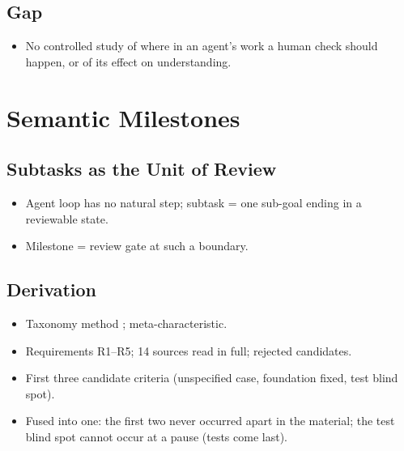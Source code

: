 \section{Gap}
\begin{itemize}
  \item No controlled study of where in an agent's work a human check should happen, or of its effect on understanding.
\end{itemize}


\chapter{Semantic Milestones}
\label{chap:criteria}

\section{Subtasks as the Unit of Review}
\begin{itemize}
  \item Agent loop has no natural step; subtask = one sub-goal ending in a reviewable state.
  \item Milestone = review gate at such a boundary.
\end{itemize}

\section{Derivation}
\begin{itemize}
  \item Taxonomy method \citep{nickerson_method_2013}; meta-characteristic.
  \item Requirements R1--R5; 14 sources read in full; rejected candidates.
  \item First three candidate criteria (unspecified case, foundation fixed, test blind spot).
  \item Fused into one: the first two never occurred apart in the material; the test blind spot cannot occur at a pause (tests come last).
\end{itemize}

